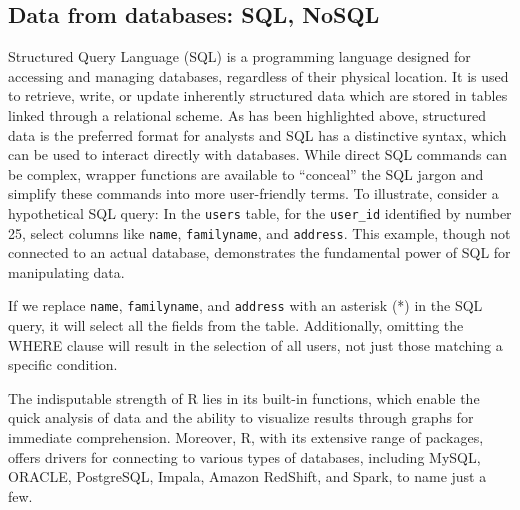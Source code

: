 \subsection{Data from databases: SQL,
NoSQL}\label{data-from-databases-sql-nosql}

Structured Query Language (SQL) is a programming language designed for
accessing and managing databases, regardless of their physical location.
It is used to retrieve, write, or update inherently structured data which
are stored in tables linked through a relational scheme. As
has been highlighted above, structured data is the preferred format for
analysts and SQL has a distinctive syntax, which can be used to interact
directly with databases. While direct SQL commands can be complex,
wrapper functions are available to ``conceal'' the SQL jargon and
simplify these commands into more user-friendly terms. To illustrate,
consider a hypothetical SQL query: In the \texttt{users} table, for the
\texttt{user\_id} identified by number 25, select columns like
\texttt{name}, \texttt{familyname}, and \texttt{address}. This example,
though not connected to an actual database, demonstrates the fundamental
power of SQL for manipulating data.

\begin{Shaded}
\begin{Highlighting}[]
\OperatorTok{=}  
\end{Highlighting}
\end{Shaded}

If we replace \texttt{name}, \texttt{familyname}, and \texttt{address}
with an asterisk (*) in the SQL query, it will select all the fields from
the table. Additionally, omitting the WHERE clause will result in the
selection of all users, not just those matching a specific condition.

\begin{Shaded}
\begin{Highlighting}[]
 \OperatorTok{*} 
\end{Highlighting}
\end{Shaded}

The indisputable strength of R lies in its built-in functions, which
enable the quick analysis of data and the ability to visualize results through
graphs for immediate comprehension. Moreover, R, with its extensive
range of packages, offers drivers for connecting to various types of
databases, including MySQL, ORACLE, PostgreSQL, Impala, Amazon RedShift,
and Spark, to name just a few.

